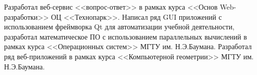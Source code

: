 \documentclass[a4paper, 10pt]{extarticle}
\begin{document}
    \noindent Разработал веб-сервис <<вопрос-ответ>> в рамках курса <<Основ Web-разработки>>
    ОЦ <<Технопарк>>. Написал ряд GUI приложений с использованием фреймворка Qt для автоматизации учебной
    деятельности, разработал математическое ПО с использованием параллельных вычислений в рамках курса <<Операционных систем>>
    МГТУ им. Н.Э.Баумана. Разработал ряд веб-приложений в рамках курса <<Компьютерной геометрии>> МГТУ им. Н.Э.Баумана.
\end{document}
